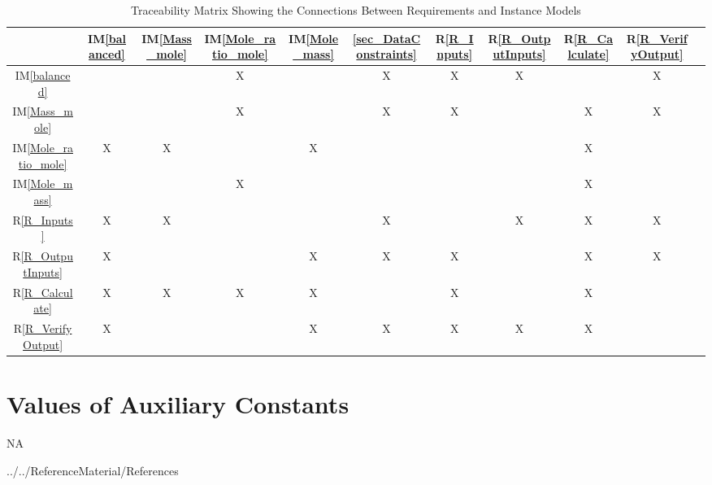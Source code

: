\documentclass[12pt]{article}
\newcommand{\iref}[1]{IM\ref{#1}}
\newcommand{\rref}[1]{R\ref{#1}}
\begin{document}
{\begin{table}[h!]
\centering

\begin{tabular}{|c|c|c|c|c|c|c|c|c|c|c|}
\hline
	& \iref{balanced} & \iref{Mass_mole}& \iref{Mole_ratio_mole}& \iref{Mole_mass} & \ref{sec_DataConstraints}& \rref{R_Inputs}& \rref{R_OutputInputs} & \rref{R_Calculate} & \rref{R_VerifyOutput} \\
\hline
\iref{balanced}  & & & X& &X & X& X& & X \\ \hline
\iref{Mass_mole}            & & & X& & X& X& & X& X \\ \hline
\iref{Mole_ratio_mole}     & X& X& & X& & & &X &  \\ \hline
\iref{Mole_mass}             & & &X & & & & & X& \\ \hline
\rref{R_Inputs}                &X & X& & & X& & X& X&X  \\ \hline
\rref{R_OutputInputs}    &X & & & X& X& X& & X&X  \\ \hline
\rref{R_Calculate}    &X &X & X& X& & X& & X&  \\ \hline
\rref{R_VerifyOutput}  &X & & & X& X& X& X& X&\\ \hline
\hline
\end{tabular}
\caption{Traceability Matrix Showing the Connections Between Requirements and Instance Models}
\label{Table:R_trace}
\end{table}
}
\newpage

\section{Values of Auxiliary Constants}
NA 

\newpage

 {../../ReferenceMaterial/References}

\newpage
\end{document}
